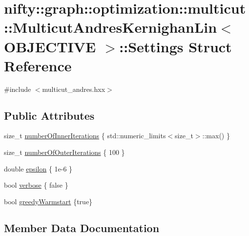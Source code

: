 \hypertarget{structnifty_1_1graph_1_1optimization_1_1multicut_1_1MulticutAndresKernighanLin_1_1Settings}{}\section{nifty\+:\+:graph\+:\+:optimization\+:\+:multicut\+:\+:Multicut\+Andres\+Kernighan\+Lin$<$ O\+B\+J\+E\+C\+T\+I\+V\+E $>$\+:\+:Settings Struct Reference}
\label{structnifty_1_1graph_1_1optimization_1_1multicut_1_1MulticutAndresKernighanLin_1_1Settings}


{\ttfamily \#include $<$multicut\+\_\+andres.\+hxx$>$}

\subsection*{Public Attributes}
\begin{DoxyCompactItemize}
\item 
size\+\_\+t \hyperlink{structnifty_1_1graph_1_1optimization_1_1multicut_1_1MulticutAndresKernighanLin_1_1Settings_ae092e725d5fe422881649c9d649e4ae7}{number\+Of\+Inner\+Iterations} \{ std\+::numeric\+\_\+limits$<$size\+\_\+t$>$\+::max() \}
\item 
size\+\_\+t \hyperlink{structnifty_1_1graph_1_1optimization_1_1multicut_1_1MulticutAndresKernighanLin_1_1Settings_a4a46fce3579186ead36d31f3b70da4be}{number\+Of\+Outer\+Iterations} \{ 100 \}
\item 
double \hyperlink{structnifty_1_1graph_1_1optimization_1_1multicut_1_1MulticutAndresKernighanLin_1_1Settings_abcc4d1d19537b5a2a770acdc894dca62}{epsilon} \{ 1e-\/6 \}
\item 
bool \hyperlink{structnifty_1_1graph_1_1optimization_1_1multicut_1_1MulticutAndresKernighanLin_1_1Settings_ac00061ba934c687233bd9dcaffabb0e9}{verbose} \{ false \}
\item 
bool \hyperlink{structnifty_1_1graph_1_1optimization_1_1multicut_1_1MulticutAndresKernighanLin_1_1Settings_aa4018f656d1604d836be6945489ff66d}{greedy\+Warmstart} \{true\}
\end{DoxyCompactItemize}


\subsection{Member Data Documentation}
\hypertarget{structnifty_1_1graph_1_1optimization_1_1multicut_1_1MulticutAndresKernighanLin_1_1Settings_abcc4d1d19537b5a2a770acdc894dca62}{}
